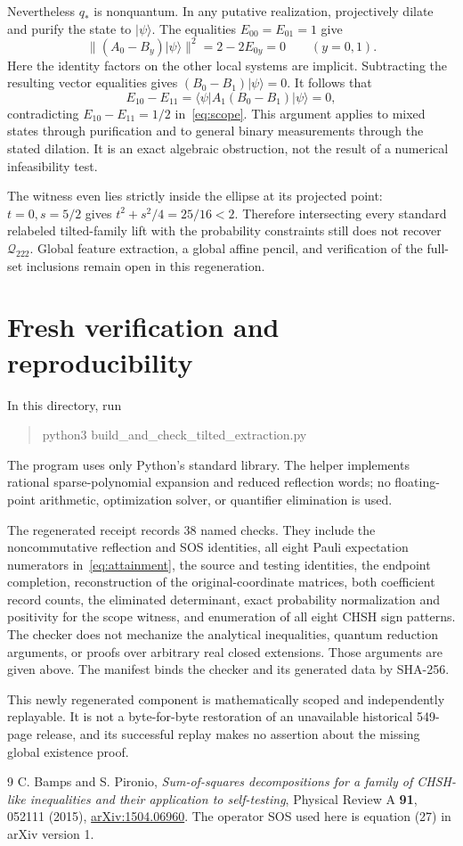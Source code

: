 \documentclass[11pt]{article}
\newcommand{\Q}{{\mathcal Q_{222}}}
\begin{document}
Nevertheless $q_*$ is nonquantum. In any putative realization, projectively dilate and purify the state to $|\psi\rangle$. The equalities $E_{00}=E_{01}=1$ give
\[
 \|(A_0-B_y)|\psi\rangle\|^2=2-2E_{0y}=0
       \qquad(y=0,1).
\]
Here the identity factors on the other local systems are implicit. Subtracting the resulting vector equalities gives $(B_0-B_1)|\psi\rangle=0$. It follows that
\[
 E_{10}-E_{11}=\langle\psi|A_1(B_0-B_1)|\psi\rangle=0,
\]
contradicting $E_{10}-E_{11}=1/2$ in~\eqref{eq:scope}. This argument applies to mixed states through purification and to general binary measurements through the stated dilation. It is an exact algebraic obstruction, not the result of a numerical infeasibility test.

The witness even lies strictly inside the ellipse at its projected point: $t=0,s=5/2$ gives $t^2+s^2/4=25/16<2$. Therefore intersecting every standard relabeled tilted-family lift with the probability constraints still does not recover $\Q$. Global feature extraction, a global affine pencil, and verification of the full-set inclusions remain open in this regeneration.

\section{Fresh verification and reproducibility}
In this directory, run
\begin{quote}\small\ttfamily
python3 build\_and\_check\_tilted\_extraction.py
\end{quote}
The program uses only Python's standard library. The helper implements rational sparse-polynomial expansion and reduced reflection words; no floating-point arithmetic, optimization solver, or quantifier elimination is used.

The regenerated receipt records 38 named checks. They include the noncommutative reflection and SOS identities, all eight Pauli expectation numerators in~\eqref{eq:attainment}, the source and testing identities, the endpoint completion, reconstruction of the original-coordinate matrices, both coefficient record counts, the eliminated determinant, exact probability normalization and positivity for the scope witness, and enumeration of all eight CHSH sign patterns. The checker does not mechanize the analytical inequalities, quantum reduction arguments, or proofs over arbitrary real closed extensions. Those arguments are given above. The manifest binds the checker and its generated data by SHA-256.

This newly regenerated component is mathematically scoped and independently replayable. It is not a byte-for-byte restoration of an unavailable historical 549-page release, and its successful replay makes no assertion about the missing global existence proof.

\begin{thebibliography}{9}
 C. Bamps and S. Pironio,
\emph{Sum-of-squares decompositions for a family of CHSH-like inequalities and their application to self-testing},
Physical Review A \textbf{91}, 052111 (2015),
\href{https://arxiv.org/abs/1504.06960}{arXiv:1504.06960}.
The operator SOS used here is equation (27) in arXiv version 1.
\end{thebibliography}
\end{document}
